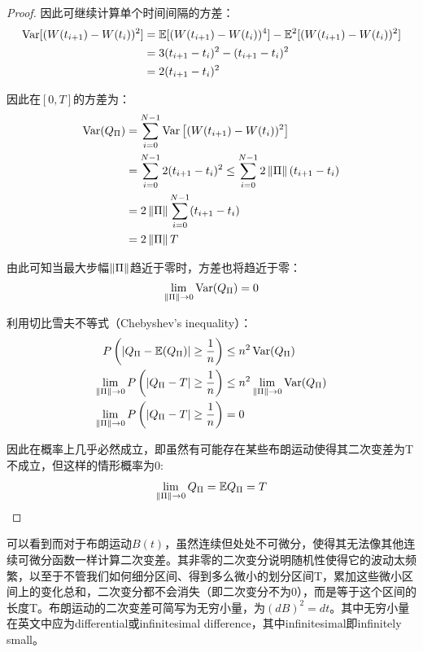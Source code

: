 \documentclass[11pt]{article}
\begin{document}
\begin{proof}
    因此可继续计算单个时间间隔的方差：
    \begin{align*}
        \operatorname{Var} [(W(t_{i+1}) - W(t_{i}))^2] &= \mathbb{E} [(W(t_{i+1}) - W(t_{i}))^4] - \mathbb{E}^2 [(W(t_{i+1}) - W(t_{i}))^2] \\
        &= 3(t_{i+1}-t_{i})^2 - (t_{i+1}-t_{i})^2 \\
        &= 2(t_{i+1}-t_{i})^2
    \end{align*}

    因此在$[0,T]$的方差为：
    \begin{align*}
        \operatorname{Var}(Q_{\Pi}) &= \sum_{i=0}^{N-1} \operatorname{Var} \left[(W(t_{i+1}) - W(t_{i}))^2 \right] \\
        &=  \sum_{i=0}^{N-1} 2(t_{i+1}-t_{i})^2
        \leq \sum_{i=0}^{N-1} 2\left\lVert \Pi\right\rVert (t_{i+1}-t_{i}) \\
        &= 2\left\lVert \Pi\right\rVert \sum_{i=0}^{N-1} (t_{i+1}-t_{i}) \\
        &= 2\left\lVert \Pi\right\rVert T
    \end{align*}

    由此可知当最大步幅$\left\lVert \Pi\right\rVert$趋近于零时，方差也将趋近于零：
    \begin{align*}
        \lim\limits_{\left\lVert \Pi\right\rVert \rightarrow 0} \operatorname{Var}(Q_{\Pi}) = 0
    \end{align*}

    利用切比雪夫不等式（Chebyshev's inequality）：
    \begin{align*}
        P\left( \left\lvert Q_{\Pi} - \mathbb{E}(Q_{\Pi})\right\rvert \geq \frac{1}{n} \right) &\leq n^2 \operatorname{Var}(Q_{\Pi}) \\
        \lim_{\left\lVert \Pi\right\rVert \rightarrow 0} P\left( \left\lvert Q_{\Pi} - T\right\rvert \geq \frac{1}{n} \right) &\leq n^2 \lim_{\left\lVert \Pi\right\rVert \rightarrow 0} \operatorname{Var}(Q_{\Pi})  \\
        \lim_{\left\lVert \Pi\right\rVert \rightarrow 0} P\left( \left\lvert Q_{\Pi} - T\right\rvert \geq \frac{1}{n} \right) &= 0
    \end{align*}
    
    因此在概率上几乎必然成立，即虽然有可能存在某些布朗运动使得其二次变差为T不成立，但这样的情形概率为0:
    \begin{equation*}
        \lim_{\left\lVert \Pi\right\rVert \rightarrow 0} Q_{\Pi} = \mathbb{E} Q_\Pi = T
    \end{equation*}
\end{proof}

可以看到而对于布朗运动$B(t)$，虽然连续但处处不可微分，使得其无法像其他连续可微分函数一样计算二次变差。其非零的二次变分说明随机性使得它的波动太频繁，以至于不管我们如何细分区间、得到多么微小的划分区间T，累加这些微小区间上的变化总和，二次变分都不会消失（即二次变分不为0），而是等于这个区间的长度T。布朗运动的二次变差可简写为无穷小量，为$(dB)^2=dt$。其中无穷小量在英文中应为differential或infinitesimal difference，其中infinitesimal即infinitely small。
\end{document}

